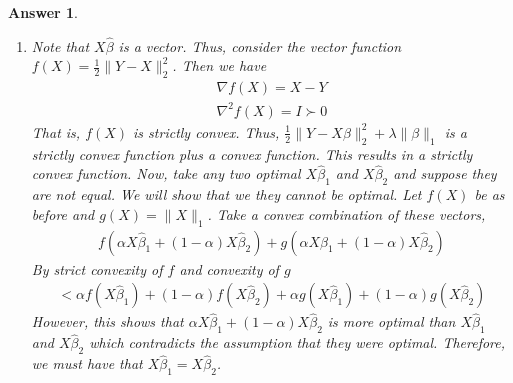 \documentclass[12pt]{article}
\theoremstyle{colon}
\newtheorem*{answer}{Answer}
\begin{document}
\begin{answer}
  \begin{enumerate}[label=\arabic*)]
    \item Note that $X \widehat{\beta}$ is a vector. Thus, consider the vector function $f(X) = \frac{1}{2}\lVert Y - X \rVert_2^2$. Then we have
      \begin{gather*}
        \nabla f(X) = X - Y \\
        \nabla^2 f(X) = I \succ 0
      \end{gather*}
      That is, $f(X)$ is strictly convex. Thus, $\frac{1}{2} \lVert Y - X \beta \rVert_2^2 + \lambda \lVert \beta \rVert_1$ is a strictly convex function plus a convex function. This results in a strictly convex function. Now, take any two optimal $X \widehat{\beta}_1$ and $X \widehat{\beta}_2$ and suppose they are not equal. We will show that we they cannot be optimal. Let $f(X)$ be as before and $g(X) = \lVert X \rVert_1$. Take a convex combination of these vectors,
      \begin{gather*}
        f(\alpha X \widehat{\beta}_1 + (1-\alpha) X \widehat{\beta}_2) + g(\alpha X \widehat{\beta}_1 + (1-\alpha)X \widehat{\beta}_2)
      \end{gather*}
      By strict convexity of $f$ and convexity of $g$
      \begin{gather*}
        < \alpha f( X \widehat{\beta}_1) + (1-\alpha) f(X \widehat{\beta}_2) + \alpha g( X \widehat{\beta}_1) + (1-\alpha) g(X \widehat{\beta}_2)
      \end{gather*}
      However, this shows that $\alpha X \widehat{\beta}_1 + (1-\alpha) X \widehat{\beta}_2$ is more optimal than $X \widehat{\beta}_1$ and $X \widehat{\beta}_2$ which contradicts the assumption that they were optimal. Therefore, we must have that $X \widehat{\beta}_1 = X \widehat{\beta}_2$.


\end{enumerate}
\end{answer}
\end{document}
